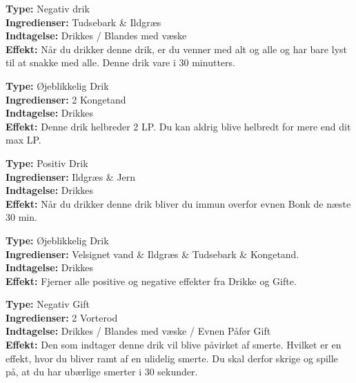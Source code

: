 \begin{gift*}
\textbf{Type:} Negativ drik\\
\textbf{Ingredienser:} Tudsebark \& Ildgræs\\
\textbf{Indtagelse:} Drikkes / Blandes med væske\\
\textbf{Effekt:} Når du drikker denne drik, er du venner med alt og alle og har bare lyst til at snakke med alle. Denne drik vare i 30 minutters.
\end{gift*}

\begin{drik*}[Helbredelsesdrik]
\textbf{Type:} Øjeblikkelig Drik\\
\textbf{Ingredienser:} 2 Kongetand\\
\textbf{Indtagelse:} Drikkes\\
\textbf{Effekt:} Denne drik helbreder 2 LP. Du kan aldrig blive helbredt for mere end dit max LP.\\
\end{drik*}


\begin{drik*}[Kranieforstærker]
\textbf{Type:} Positiv Drik\\
\textbf{Ingredienser:} Ildgræs \& Jern\\
\textbf{Indtagelse:} Drikkes\\
\textbf{Effekt:} Når du drikker denne drik bliver du immun overfor evnen Bonk de næste 30 min.\\
\end{drik*}

\begin{drik*}
\textbf{Type:} Øjeblikkelig Drik\\
\textbf{Ingredienser:} Velsignet vand \& Ildgræs \& Tudsebark \& Kongetand.\\
\textbf{Indtagelse:} Drikkes\\
\textbf{Effekt:} Fjerner alle positive og negative effekter fra Drikke og Gifte.
\end{drik*}

\begin{gift*}[Smertedrik]
\textbf{Type:} Negativ Gift\\
\textbf{Ingredienser:} 2 Vorterod\\
\textbf{Indtagelse:} Drikkes / Blandes med væske / Evnen Påfør Gift\\
\textbf{Effekt:} Den som indtager denne drik vil blive påvirket af smerte. Hvilket er en effekt, hvor du bliver ramt af en ulidelig smerte. Du skal derfor skrige og spille på, at du har ubærlige smerter i 30 sekunder.\\
\end{gift*}

